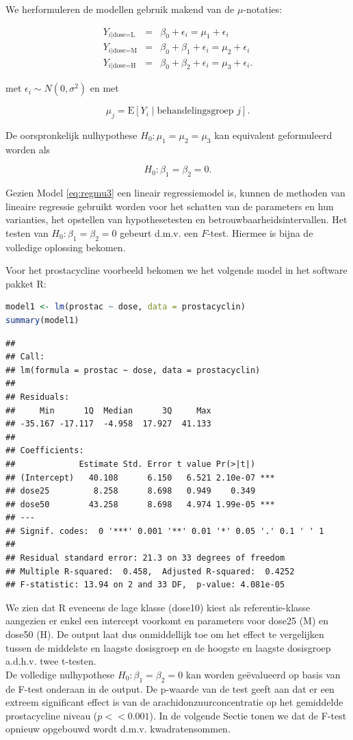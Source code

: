 \documentclass[
  12pt,dutch,coursenotes]{book}
\theoremstyle{definition}
\theoremstyle{definition}
\theoremstyle{definition}
\theoremstyle{definition}
\theoremstyle{remark}
\begin{document}
We herformuleren de modellen gebruik makend van de \(\mu\)-notaties:

\begin{eqnarray*}
 Y_{i\vert \text{dose=L}} &=& \beta_0+\epsilon_i = \mu_1+\epsilon_i \\
 Y_{i\vert \text{dose=M}} &=& \beta_0+\beta_1+ \epsilon_i = \mu_2+\epsilon_i \\
 Y_{i\vert \text{dose=H}} &=& \beta_0+\beta_2 + \epsilon_i = \mu_3+\epsilon_i .
\end{eqnarray*}

met \(\epsilon_i \sim N(0,\sigma^2)\) en met

\[  \mu_j = \text{E}\left[Y_i \mid \text{behandelingsgroep } j\right].\]

De oorspronkelijk nulhypothese \(H_0:\mu_1=\mu_2=\mu_3\) kan equivalent geformuleerd worden als

\[H_0: \beta_1=\beta_2=0.\]

Gezien Model \eqref{eq:regmu3} een lineair regressiemodel is, kunnen de methoden van lineaire regressie gebruikt worden voor het schatten van de parameters en hun varianties, het opstellen van hypothesetesten en betrouwbaarheidsintervallen.
Het testen van \(H_0: \beta_1=\beta_2=0\) gebeurt d.m.v. een \(F\)-test.
Hiermee is bijna de volledige oplossing bekomen.

Voor het prostacycline voorbeeld bekomen we het volgende model in het software pakket R:

\begin{lstlisting}[language=R]
model1 <- lm(prostac ~ dose, data = prostacyclin)
summary(model1)
\end{lstlisting}

\begin{lstlisting}
## 
## Call:
## lm(formula = prostac ~ dose, data = prostacyclin)
## 
## Residuals:
##     Min      1Q  Median      3Q     Max 
## -35.167 -17.117  -4.958  17.927  41.133 
## 
## Coefficients:
##             Estimate Std. Error t value Pr(>|t|)    
## (Intercept)   40.108      6.150   6.521 2.10e-07 ***
## dose25         8.258      8.698   0.949    0.349    
## dose50        43.258      8.698   4.974 1.99e-05 ***
## ---
## Signif. codes:  0 '***' 0.001 '**' 0.01 '*' 0.05 '.' 0.1 ' ' 1
## 
## Residual standard error: 21.3 on 33 degrees of freedom
## Multiple R-squared:  0.458,  Adjusted R-squared:  0.4252 
## F-statistic: 13.94 on 2 and 33 DF,  p-value: 4.081e-05
\end{lstlisting}

We zien dat R eveneens de lage klasse (dose10) kiest als referentie-klasse aangezien er enkel een intercept voorkomt en parameters voor dose25 (M) en dose50 (H).
De output laat dus onmiddellijk toe om het effect te vergelijken tussen de middelste en laagste dosisgroep en de hoogste en laagste dosisgroep a.d.h.v. twee t-testen.\\
De volledige nulhypothese \(H_0: \beta_1=\beta_2=0\) kan worden geëvalueerd op basis van de F-test onderaan in de output.
De p-waarde van de test geeft aan dat er een extreem significant effect is van de arachidonzuurconcentratie op het gemiddelde prostacycline niveau (\(p<<0.001\)).
In de volgende Sectie tonen we dat de F-test opnieuw opgebouwd wordt d.m.v. kwadratensommen.
\end{document}

